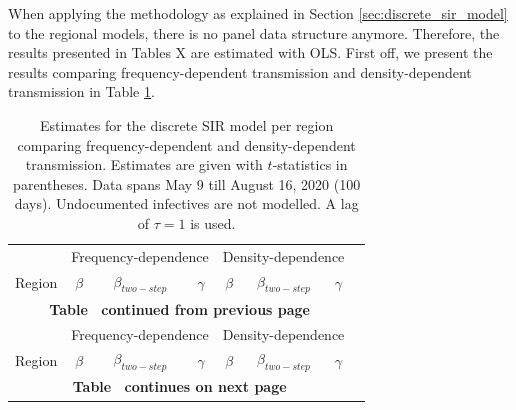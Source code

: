 \documentclass[12pt]{article}
\begin{document}
	When applying the methodology as explained in Section \ref{sec:discrete_sir_model} to the regional models, there is no panel data structure anymore. Therefore, the results presented in Tables X are estimated with OLS. First off, we present the results comparing frequency-dependent transmission and density-dependent transmission in Table \ref{tab:results_discrete_regional_transmission}.
	
	\begin{landscape}
	\begin{longtable}{@{}lccccccc@{}}
	    \caption{Estimates for the discrete SIR model per region comparing frequency-dependent and density-dependent transmission. Estimates are given with $t$-statistics in parentheses. Data spans May 9 till August 16, 2020 (100 days). Undocumented infectives are not modelled. A lag of $\tau=1$ is used.}
		\label{tab:results_discrete_regional_transmission}\\
		\toprule
		                & \multicolumn{3}{c}{Frequency-dependence} & \multicolumn{3}{c}{Density-dependence} \\
		                \cmidrule(lr){2-4}
                        \cmidrule(lr){5-7}
		Region          & $\beta$ & $\beta_{two-step}$ & $\gamma$ & $\beta$ & $\beta_{two-step}$ & $\gamma$ \\* \midrule
		\endfirsthead
		
		\multicolumn{7}{c}{{\bfseries Table \thetable\ continued from previous page}} \\
		\toprule
		                & \multicolumn{3}{c}{Frequency-dependence} & \multicolumn{3}{c}{Density-dependence} \\
		                \cmidrule(lr){2-4}
                        \cmidrule(lr){5-7}
		Region          & $\beta$ & $\beta_{two-step}$ & $\gamma$ & $\beta$ & $\beta_{two-step}$ & $\gamma$ \\* \midrule
		\endhead
		
		\bottomrule
		\multicolumn{7}{c}{{\bfseries Table \thetable\ continues on next page}}
		\endfoot
		

\end{longtable}
\end{landscape}
\end{document}
